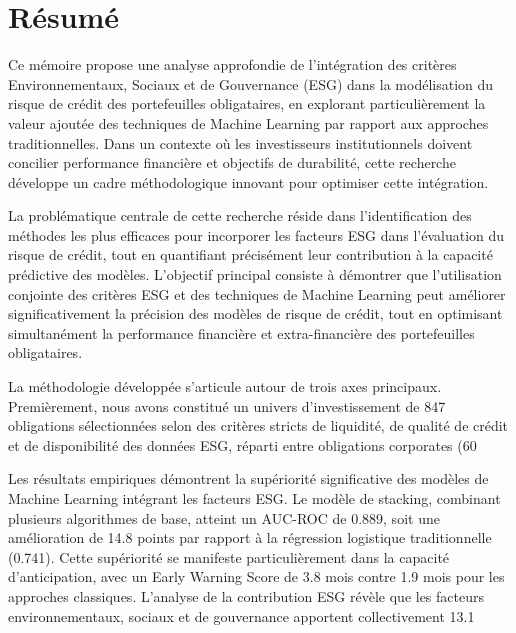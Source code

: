 \chapter*{Résumé}

Ce mémoire propose une analyse approfondie de l'intégration des critères Environnementaux, Sociaux et de Gouvernance (ESG) dans la modélisation du risque de crédit des portefeuilles obligataires, en explorant particulièrement la valeur ajoutée des techniques de Machine Learning par rapport aux approches traditionnelles. Dans un contexte où les investisseurs institutionnels doivent concilier performance financière et objectifs de durabilité, cette recherche développe un cadre méthodologique innovant pour optimiser cette intégration.

La problématique centrale de cette recherche réside dans l'identification des méthodes les plus efficaces pour incorporer les facteurs ESG dans l'évaluation du risque de crédit, tout en quantifiant précisément leur contribution à la capacité prédictive des modèles. L'objectif principal consiste à démontrer que l'utilisation conjointe des critères ESG et des techniques de Machine Learning peut améliorer significativement la précision des modèles de risque de crédit, tout en optimisant simultanément la performance financière et extra-financière des portefeuilles obligataires.

La méthodologie développée s'articule autour de trois axes principaux. Premièrement, nous avons constitué un univers d'investissement de 847 obligations sélectionnées selon des critères stricts de liquidité, de qualité de crédit et de disponibilité des données ESG, réparti entre obligations corporates (60%

Les résultats empiriques démontrent la supériorité significative des modèles de Machine Learning intégrant les facteurs ESG. Le modèle de stacking, combinant plusieurs algorithmes de base, atteint un AUC-ROC de 0.889, soit une amélioration de 14.8 points par rapport à la régression logistique traditionnelle (0.741). Cette supériorité se manifeste particulièrement dans la capacité d'anticipation, avec un Early Warning Score de 3.8 mois contre 1.9 mois pour les approches classiques. L'analyse de la contribution ESG révèle que les facteurs environnementaux, sociaux et de gouvernance apportent collectivement 13.1%

